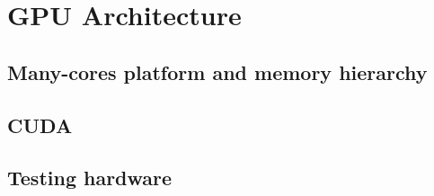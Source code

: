 \chapter{GPU Architecture}\label{ch:gpu}

\section{Many-cores platform and memory hierarchy}

\section{CUDA}

\section{Testing hardware}\label{sec:benchmark}